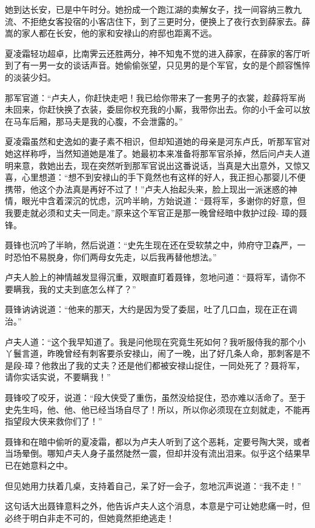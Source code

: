 \documentclass[12pt,oneside]{book}
\begin{document}
她到达长安，已是中午时分。她扮成一个跑江湖的卖解女子，找一间容纳三教九流、不拒绝女客投宿的小客店住下，到了三更时分，便换上了夜行衣到薛家去。薛嵩的家人都在长安，他的家和安禄山的府邸也距离不远。

夏凌霜轻功超卓，比南霁云还胜两分，神不知鬼不觉的进入薛家，在薛家的客厅听到了有一男一女的谈话声音。她偷偷张望，只见男的是个军官，女的是个颜容憔悴的淡装少妇。

那军官道：``卢夫人，你赶快走吧！我已给你带来了一套男子的衣裳，趁薛将军尚未回来，你赶快换了衣装，委屈你权充我的小厮，我带你出去。你的小千金可以放在马车后厢，那马夫是我的心腹，不会泄露的。''

夏凌霜虽然和史逸如的妻子素不相识，但却知道她的母亲是河东卢氏，听那军官对她这样称呼，当然知道她是准了。她最初本来准备将那军官杀掉，然后问卢夫人道明来意，救她出去，现在突然听到那军官说出这番说话，当真是大出意外，又惊又喜，心里想道：``想不到安禄山的手下竟然也有这样的好人，我正担心那婴儿不便携带，他这个办法真是再好不过了！''卢夫人抬起头来，脸上现出一派迷惑的神情，眼光中含着深沉的忧虑，沉吟半晌，方始说道：``聂将军，多谢你的好意，但我要走就必须和丈夫一同走。''原来这个军官正是那一晚曾经暗中救护过段-
璋的聂锋。

聂锋也沉吟了半晌，然后说道：``史先生现在还在受软禁之中，帅府守卫森严，一时恐怕不易脱身，你们两母女先走，以后我再替他想法。''

卢夫人脸上的神情越发显得沉重，双眼直盯着聂锋，忽地问道：``聂将军，请你不要瞒我，我的丈夫到底怎么样了？''

聂锋讷讷说道：``他来的那天，大约是因为受了委屈，吐了几口血，现在正在调治。''

卢夫人道：``这个我早知道了。我是问他现在究竟生死如何？我听服侍我的那个小丫鬟言道，昨晚曾经有刺客要杀安禄山，闹了一晚，出了好几条人命，那刺客是不是段-璋？他救出了我的丈夫？还是他们都被安禄山捉住，一同处死了？聂将军，请你实话实说，不要瞒我！''

聂锋咬了咬牙，说道：``段大侠受了重伤，虽然没给捉住，恐亦难以活命了。至于史先生吗，他、他、他已经当场自尽了！所以，所以你必须现在立刻就走，不能再指望段大侠来救你们了！''

聂锋和在暗中偷听的夏凌霜，都以为卢夫人听到了这个恶耗，定要号陶大哭，或者当场晕倒。哪知卢夫人身子虽然陡然一震，但却并没有流出泪来。似乎这个结果早已在她意料之中。

但见她用力扶着几桌，支持着自己，呆了好一会子，忽地沉声说道：``我不走！''

这句话大出聂锋意料之外，他告诉卢夫人这个消息，本意是宁可让她悲痛一时，但必终于明白非走不可的，但她竟然拒绝逃走！
\end{document}

